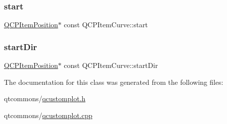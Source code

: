 \subsubsection{\texorpdfstring{start}{start}}
{\footnotesize\ttfamily \mbox{\hyperlink{class_q_c_p_item_position}{Q\+C\+P\+Item\+Position}}$\ast$ const Q\+C\+P\+Item\+Curve\+::start}

\mbox{\label{class_q_c_p_item_curve_aa124bf66c09cc51c627fb49db8bf8a7b}} 
\subsubsection{\texorpdfstring{startDir}{startDir}}
{\footnotesize\ttfamily \mbox{\hyperlink{class_q_c_p_item_position}{Q\+C\+P\+Item\+Position}}$\ast$ const Q\+C\+P\+Item\+Curve\+::start\+Dir}



The documentation for this class was generated from the following files\+:\begin{DoxyCompactItemize}
\item 
qtcommons/\mbox{\hyperlink{qcustomplot_8h}{qcustomplot.\+h}}\item 
qtcommons/\mbox{\hyperlink{qcustomplot_8cpp}{qcustomplot.\+cpp}}\end{DoxyCompactItemize}
